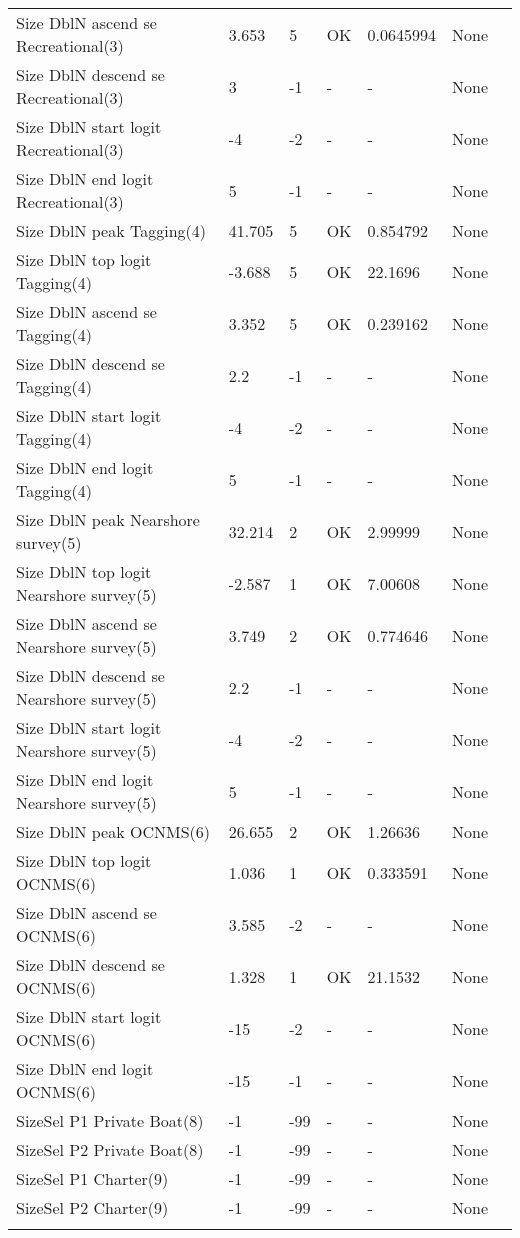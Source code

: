 \documentclass[11pt,
  english,
  letterpaper,
]{article}
\begin{document}
\begin{landscape}
\begin{longtable}[t]{>{\raggedright\arraybackslash}p{6cm}lllll>{\raggedright\arraybackslash}p{4cm}}
Size DblN ascend se Recreational(3) & 3.653 & 5 & OK & 0.0645994 & None\\
Size DblN descend se Recreational(3) & 3 & -1 & - & - & None\\
Size DblN start logit Recreational(3) & -4 & -2 & - & - & None\\
Size DblN end logit Recreational(3) & 5 & -1 & - & - & None\\
Size DblN peak Tagging(4) & 41.705 & 5 & OK & 0.854792 & None\\
Size DblN top logit Tagging(4) & -3.688 & 5 & OK & 22.1696 & None\\
Size DblN ascend se Tagging(4) & 3.352 & 5 & OK & 0.239162 & None\\
Size DblN descend se Tagging(4) & 2.2 & -1 & - & - & None\\
Size DblN start logit Tagging(4) & -4 & -2 & - & - & None\\
Size DblN end logit Tagging(4) & 5 & -1 & - & - & None\\
Size DblN peak Nearshore survey(5) & 32.214 & 2 & OK & 2.99999 & None\\
Size DblN top logit Nearshore survey(5) & -2.587 & 1 & OK & 7.00608 & None\\
Size DblN ascend se Nearshore survey(5) & 3.749 & 2 & OK & 0.774646 & None\\
Size DblN descend se Nearshore survey(5) & 2.2 & -1 & - & - & None\\
Size DblN start logit Nearshore survey(5) & -4 & -2 & - & - & None\\
Size DblN end logit Nearshore survey(5) & 5 & -1 & - & - & None\\
Size DblN peak OCNMS(6) & 26.655 & 2 & OK & 1.26636 & None\\
Size DblN top logit OCNMS(6) & 1.036 & 1 & OK & 0.333591 & None\\
Size DblN ascend se OCNMS(6) & 3.585 & -2 & - & - & None\\
Size DblN descend se OCNMS(6) & 1.328 & 1 & OK & 21.1532 & None\\
Size DblN start logit OCNMS(6) & -15 & -2 & - & - & None\\
Size DblN end logit OCNMS(6) & -15 & -1 & - & - & None\\
SizeSel P1 Private Boat(8) & -1 & -99 & - & - & None\\
SizeSel P2 Private Boat(8) & -1 & -99 & - & - & None\\
SizeSel P1 Charter(9) & -1 & -99 & - & - & None\\
SizeSel P2 Charter(9) & -1 & -99 & - & - & None\\*
\end{longtable}
\endgroup{}
\end{landscape}
\endgroup{}
\end{document}
